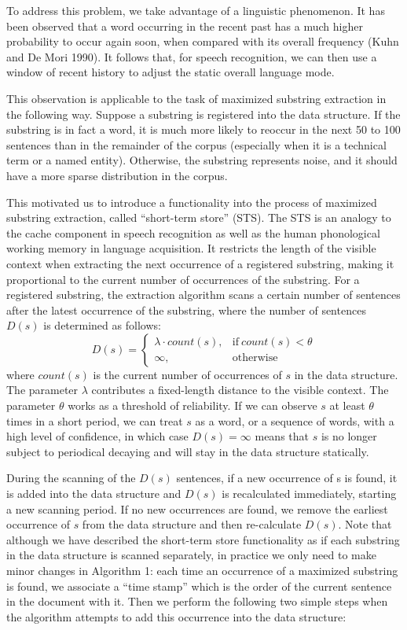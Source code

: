 \documentclass[english]{jnlp_1.4}
\begin{document}
To address this problem, we take advantage of a linguistic phenomenon. It has been observed that a word occurring in the recent past has a much higher probability to occur again soon, when compared with its overall frequency (Kuhn and De Mori 1990). It follows that, for speech recognition, we can then use a window of recent history to adjust the static overall language mode.

This observation is applicable to the task of maximized substring extraction in the following way. Suppose a substring is registered into the data structure. If the substring is in fact a word, it is much more likely to reoccur in the next 50 to 100 sentences than in the remainder of the corpus (especially when it is a technical term or a named entity). Otherwise, the substring represents noise, and it should have a more sparse distribution in the corpus.

This motivated us to introduce a functionality into the process of maximized substring extraction, called ``short-term store'' (STS). The STS is an analogy to the cache component in speech recognition as well as the human phonological working memory in language acquisition. It restricts the length of the visible context when extracting the next occurrence of a registered substring, making it proportional to the current number of occurrences of the substring. For a registered substring, the extraction algorithm scans a certain number of sentences after the latest occurrence of the substring, where the number of sentences $D(s)$ is determined as follows:
\[
D(s)=
\begin{cases}
\lambda \cdot count(s), & \text{if}\ count(s) < \theta\\
\infty, & \text{otherwise}
\end{cases}
\]
where $count(s)$ is the current number of occurrences of $s$ in the data structure. The parameter $\lambda$ contributes a fixed-length distance to the visible context. The parameter $\theta$ works as a threshold of reliability. If we can observe $s$ at least 
$\theta$ times in a short period, we can treat $s$ as a word, or a sequence of words, with a high level of confidence, in which case 
$D(s)=\infty$ means that $s$ is no longer subject to periodical decaying and will stay in the data structure statically.

During the scanning of the $D(s)$ sentences, if a new occurrence of s is found, it is added into the data structure and $D(s)$ is recalculated immediately, starting a new scanning period. If no new occurrences are found, we remove the earliest occurrence of $s$ from the data structure and then re-calculate $D(s)$. Note that although we have described the short-term store functionality as if each substring in the data structure is scanned separately, in practice we only need to make minor changes in Algorithm 1: each time an occurrence of a maximized substring is found, we associate a ``time stamp'' which is the order of the current sentence in the document with it. Then we perform the following two simple steps when the algorithm attempts to add this occurrence into the data structure:
\end{document}
